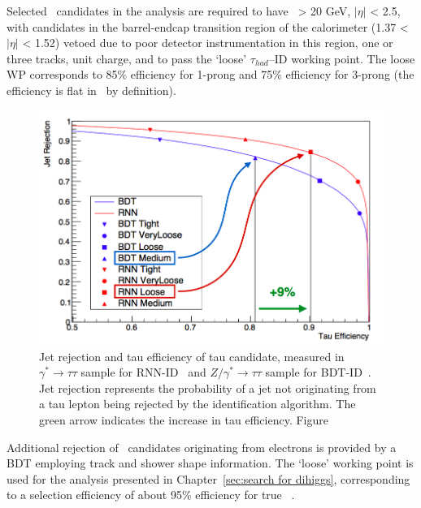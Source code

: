 Selected \tauhadvis\ candidates in the analysis are required to have 
\pt\ > 20 GeV, $|\eta|$ < 2.5, with candidates in the barrel-endcap 
transition region of the calorimeter (1.37 < $|\eta|$ < 1.52) vetoed 
due to poor detector instrumentation in this region, 
one or three tracks, unit charge, and to pass the `loose' $\tau_{had}$--ID working point.
The loose WP corresponds to 85\% efficiency for 1-prong 
and 75\% efficiency for 3-prong (the efficiency is
flat in \pt\ by definition).
\begin{figure}[bth]
	\begin{centering}	
	\includegraphics[width=.9\textwidth]{Reconstruction/plots/tauRNN.png}
	\caption{Jet rejection and tau efficiency of tau candidate, 
    measured in $\gamma^* \rightarrow \tau\tau$ sample for RNN-ID~\cite{ATL-PHYS-PUB-2019-033}
    and $Z/\gamma^* \rightarrow \tau\tau$ sample for BDT-ID~\cite{ATL-PHYS-PUB-2015-045}.
    Jet rejection represents the probability of a jet 
    not originating from a tau lepton being rejected 
    by the identification algorithm.
    The green arrow indicates the increase in tau efficiency.
    Figure}
	\label{fig:RNNtau}
	\end{centering}
\end{figure}

Additional rejection of \tauhadvis\ candidates originating 
from electrons is provided by a BDT employing track
and shower shape information. The `loose' working point is used
for the analysis presented in Chapter~\ref{sec:search for dihiggs}, 
corresponding to a selection efficiency
of about 95\% efficiency for true \tauhadvis~\cite{ATLAS-CONF-2017-029}.



